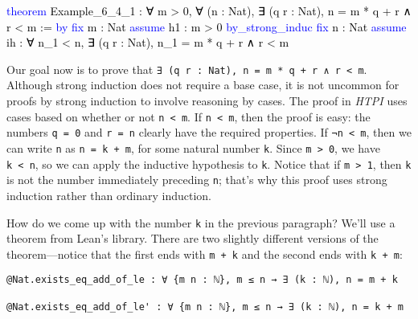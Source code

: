 \documentclass[
  letterpaper,
  DIV=11,
  numbers=noendperiod]{scrreprt}
\makeatletter
\newenvironment{Shaded}{\begin{snugshade}}{\end{snugshade}}
\newcommand{\KeywordTok}[1]{\textcolor[rgb]{0.00,0.23,0.31}{#1}}
\newcommand{\NormalTok}[1]{\textcolor[rgb]{0.00,0.23,0.31}{#1}}
\newcommand{\SpecialCharTok}[1]{\textcolor[rgb]{0.37,0.37,0.37}{#1}}
\newcommand{\WarningTok}[1]{\textcolor[rgb]{0.37,0.37,0.37}{\textit{#1}}}
\def\redsquiggly{\bgroup \markoverwith{\textcolor{red}{\lower3.5\p@\hbox{\sixly \char58}}}\ULon}
\renewcommand{\NormalTok}[1]{\textcolor[HTML]{000000}{#1}}
\renewcommand{\KeywordTok}[1]{\textcolor[HTML]{0000FF}{#1}}
\renewcommand{\SpecialCharTok}[1]{}
\renewcommand{\WarningTok}[1]{\redsquiggly{\textcolor[HTML]{0000FF}{#1}}}
\newenvironment{ind}
	{\begin{list}{}{\setlength{\leftmargin}{1em}}\item\relax}
	{\end{list}}
\theoremstyle{remark}
\makeatother
\begin{document}
\begin{Shaded}
\begin{Highlighting}[]
\KeywordTok{theorem}\NormalTok{ Example\_6\_4\_1 : ∀ m \textgreater{} 0, ∀ (n : Nat),}
\NormalTok{    ∃ (q r : Nat), n = m * q + r ∧ r \textless{} m := }\KeywordTok{by}
  \KeywordTok{fix}\NormalTok{ m : Nat}
  \KeywordTok{assume}\NormalTok{ h1 : m \textgreater{} 0}
  \KeywordTok{by\_strong\_induc}
  \KeywordTok{fix}\NormalTok{ n : Nat}
  \KeywordTok{assume}\NormalTok{ ih : ∀ n\_1 \textless{} n, ∃ (q r : Nat), n\_1 = m * q + r ∧ r \textless{} m}
  \SpecialCharTok{**}\WarningTok{done}\SpecialCharTok{::}
\end{Highlighting}
\end{Shaded}

Our goal now is to prove that
\texttt{∃\ (q\ r\ :\ Nat),\ n\ =\ m\ *\ q\ +\ r\ ∧\ r\ \textless{}\ m}.
Although strong induction does not require a base case, it is not
uncommon for proofs by strong induction to involve reasoning by cases.
The proof in \emph{HTPI} uses cases based on whether or not
\texttt{n\ \textless{}\ m}. If \texttt{n\ \textless{}\ m}, then the
proof is easy: the numbers \texttt{q\ =\ 0} and
\texttt{r\hspace{0pt}\ =\ n} clearly have the required properties. If
\texttt{¬n\ \textless{}\ m}, then we can write \texttt{n} as
\texttt{n\ =\ k\ +\ m}, for some natural number \texttt{k}. Since
\texttt{m\ \textgreater{}\ 0}, we have \texttt{k\ \textless{}\ n}, so we
can apply the inductive hypothesis to \texttt{k}. Notice that if
\texttt{m\ \textgreater{}\ 1}, then \texttt{k} is not the number
immediately preceding \texttt{n}; that's why this proof uses strong
induction rather than ordinary induction.

How do we come up with the number \texttt{k} in the previous paragraph?
We'll use a theorem from Lean's library. There are two slightly
different versions of the theorem---notice that the first ends with
\texttt{m\ +\ k} and the second ends with \texttt{k\ +\ m}:

\begin{ind}

\begin{verbatim}
@Nat.exists_eq_add_of_le : ∀ {m n : ℕ}, m ≤ n → ∃ (k : ℕ), n = m + k

@Nat.exists_eq_add_of_le' : ∀ {m n : ℕ}, m ≤ n → ∃ (k : ℕ), n = k + m
\end{verbatim}

\end{ind}
\end{document}
